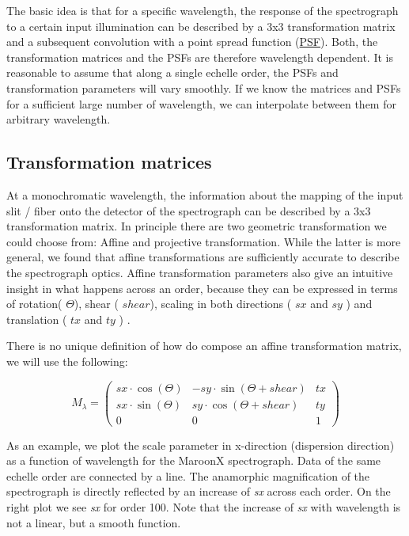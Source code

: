 The basic idea is that for a specific wavelength, the response of the spectrograph to a certain input illumination can be described by a 3x3 transformation matrix and a subsequent convolution with a point spread function (\hyperlink{class_p_s_f}{P\+SF}). Both, the transformation matrices and the P\+S\+Fs are therefore wavelength dependent. It is reasonable to assume that along a single echelle order, the P\+S\+Fs and transformation parameters will vary smoothly. If we know the matrices and P\+S\+Fs for a sufficient large number of wavelength, we can interpolate between them for arbitrary wavelength.

\subsection*{Transformation matrices}

At a monochromatic wavelength, the information about the mapping of the input slit / fiber onto the detector of the spectrograph can be described by a 3x3 transformation matrix. In principle there are two geometric transformation we could choose from\+: Affine and projective transformation. While the latter is more general, we found that affine transformations are sufficiently accurate to describe the spectrograph optics. Affine transformation parameters also give an intuitive insight in what happens across an order, because they can be expressed in terms of rotation( $\Theta$), shear ( $shear$), scaling in both directions ( $sx$ and $sy$ ) and translation ( $tx$ and $ty$ ) .

There is no unique definition of how do compose an affine transformation matrix, we will use the following\+:

\[ M_{\lambda} = \begin{pmatrix} sx \cdot \cos(\Theta) & -sy \cdot \sin(\Theta+shear) & tx \\ sx \cdot \sin(\Theta) & sy \cdot \cos(\Theta+shear) & ty \\ 0 & 0 & 1 \end{pmatrix} \]

As an example, we plot the scale parameter in x-\/direction (dispersion direction) as a function of wavelength for the MaroonX spectrograph. Data of the same echelle order are connected by a line. The anamorphic magnification of the spectrograph is directly reflected by an increase of {\itshape sx} across each order. On the right plot we see {\itshape sx} for order 100. Note that the increase of {\itshape sx} with wavelength is not a linear, but a smooth function.



